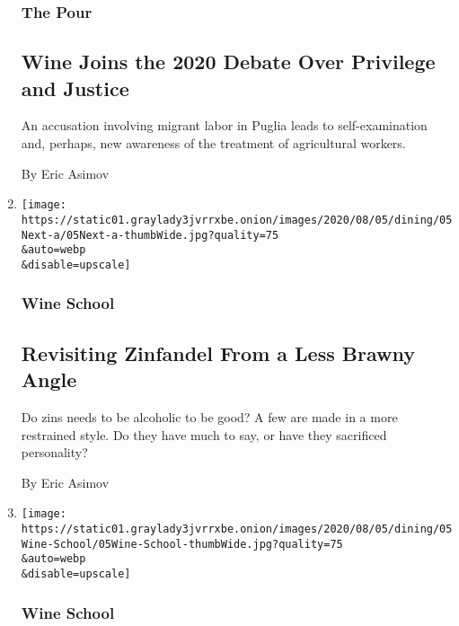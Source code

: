 \begin{enumerate}
  \hypertarget{the-pour-2}{%
  \subsubsection{The Pour}\label{the-pour-2}}

  \hypertarget{wine-joins-the-2020-debate-over-privilege-and-justice}{%
  \subsection{Wine Joins the 2020 Debate Over Privilege and
  Justice}\label{wine-joins-the-2020-debate-over-privilege-and-justice}}

  An accusation involving migrant labor in Puglia leads to
  self-examination and, perhaps, new awareness of the treatment of
  agricultural workers.

  By Eric Asimov
\item
  \href{/2020/07/30/dining/drinks/wine-school-assignment-zinfandel.html}{}

  \texttt{[image: https://static01.graylady3jvrrxbe.onion/images/2020/08/05/dining/05Next-a/05Next-a-thumbWide.jpg?quality=75\\\&auto=webp\\\&disable=upscale]}

  \hypertarget{wine-school-2}{%
  \subsubsection{Wine School}\label{wine-school-2}}

  \hypertarget{revisiting-zinfandel-from-a-less-brawny-angle}{%
  \subsection{Revisiting Zinfandel From a Less Brawny
  Angle}\label{revisiting-zinfandel-from-a-less-brawny-angle}}

  Do zins needs to be alcoholic to be good? A few are made in a more
  restrained style. Do they have much to say, or have they sacrificed
  personality?

  By Eric Asimov
\item
  \href{/2020/07/30/dining/drinks/wine-school-verdicchio-di-matelica.html}{}

  \texttt{[image: https://static01.graylady3jvrrxbe.onion/images/2020/08/05/dining/05Wine-School/05Wine-School-thumbWide.jpg?quality=75\\\&auto=webp\\\&disable=upscale]}

  \hypertarget{wine-school-3}{%
  \subsubsection{Wine School}\label{wine-school-3}}


\end{enumerate}
